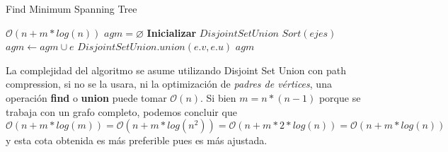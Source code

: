 \begin{algorithm}[H]
\caption{Find Minimum Spanning Tree}
\begin{algorithmic}[1]
 				\Comment $\mathcal{O}(n + m*log(n))$
	\State $agm = \varnothing$ 
	\Statex
	\State \textbf{Inicializar} $DisjointSetUnion$ 						
	\State $Sort(ejes)$ 												
			\State $agm \gets agm \cup e$
			\State $DisjointSetUnion.union(e.v, e.u)$
		\EndIf
	\EndFor
	\Statex
	\State \Return $agm$
\EndFunction
\end{algorithmic}
\end{algorithm}

La complejidad del algoritmo se asume utilizando Disjoint Set Union con path compression, si no se la usara, ni la optimización de \textit{padres de vértices}, una operación \textbf{find} o \textbf{union} puede tomar $\mathcal{O}(n)$. Si bien $m = n*(n-1)$ porque se trabaja con un grafo completo, podemos concluir que $\mathcal{O}(n + m*log(m)) = \mathcal{O}(n + m*log(n^2)) = \mathcal{O}(n + m*2*log(n)) = \mathcal{O}(n + m*log(n))$ y esta cota obtenida es más preferible pues es más ajustada.
